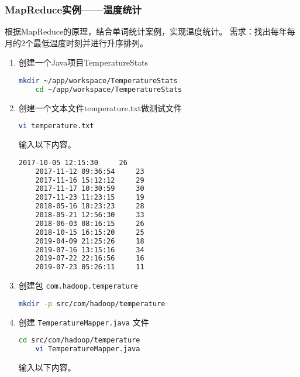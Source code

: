 \documentclass{article}
\newenvironment{enum}{
    \begin{enumerate}[label=(\arabic*), noitemsep]
}{
    \end{enumerate}
}
\begin{document}
\subsubsection{MapReduce实例——温度统计}

根据MapReduce的原理，结合单词统计案例，实现温度统计。
需求：找出每年每月的2个最低温度时刻并进行升序排列。

\begin{enum}
    \item 创建一个Java项目TemperatureStats
    
    \begin{lstlisting}[language=bash]
    mkdir ~/app/workspace/TemperatureStats
    cd ~/app/workspace/TemperatureStats
    \end{lstlisting}
    
    \item 创建一个文本文件temperature.txt做测试文件
    
    \begin{lstlisting}[language=bash]
    vi temperature.txt
    \end{lstlisting}
    
    输入以下内容。
    
    \begin{lstlisting}[language=bash]
    2017-10-05 12:15:30     26
    2017-11-12 09:36:54     23
    2017-11-16 15:12:12     29
    2017-11-17 10:30:59     30
    2017-11-23 11:23:15     19
    2018-05-16 18:23:23     28
    2018-05-21 12:56:30     33
    2018-06-03 08:16:15     26
    2018-10-15 16:15:20     25
    2019-04-09 21:25:26     18
    2019-07-16 13:15:16     34
    2019-07-22 22:16:56     16
    2019-07-23 05:26:11     11
    \end{lstlisting}
    
    \item 创建包 \texttt{com.hadoop.temperature}
    
    \begin{lstlisting}[language=bash]
    mkdir -p src/com/hadoop/temperature
    \end{lstlisting}
    
    \item 创建 \texttt{TemperatureMapper.java} 文件
    
    \begin{lstlisting}[language=bash]
    cd src/com/hadoop/temperature
    vi TemperatureMapper.java
    \end{lstlisting}
    
    输入以下内容。
    

\end{enum}
\end{document}
